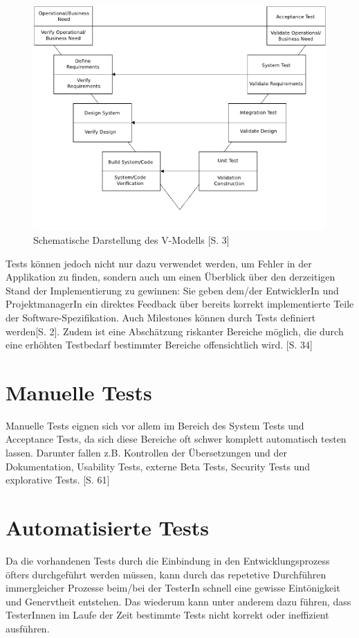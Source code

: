 \documentclass[a4paper,bibtotoc,oneside]{scrbook}
\begin{document}
\begin{figure}[h!]
\centering
\includegraphics[width=120mm]{img/vmodel.png}
\caption[Schematische Darstellung des V-Modells]{Schematische Darstellung des V-Modells \cite{vmodel}[S. 3]}\label{Abb3}
\end{figure}

Tests können jedoch nicht nur dazu verwendet werden, um Fehler in der Applikation zu finden, sondern auch um einen Überblick über den derzeitigen Stand der Implementierung zu gewinnen: Sie geben dem/der EntwicklerIn und ProjektmanagerIn ein direktes Feedback über bereits korrekt implementierte Teile der Software-Spezifikation. Auch Milestones können durch Tests definiert werden\cite{test_auto}[S. 2]. Zudem ist eine Abschätzung riskanter Bereiche möglich, die durch eine erhöhten Testbedarf bestimmter Bereiche offensichtlich wird. \cite{testing_apps_on_web}[S. 34]


\section{Manuelle Tests}
Manuelle Tests eignen sich vor allem im Bereich des System Tests und Acceptance Tests, da sich diese Bereiche oft schwer komplett automatisch testen lassen. Darunter fallen z.B. Kontrollen der Übersetzungen und der Dokumentation, Usability Tests, externe Beta Tests, Security Tests und explorative Tests. \cite{test_large_systems}[S. 61]


\section{Automatisierte Tests}
Da die vorhandenen Tests durch die Einbindung in den Entwicklungsprozess öfters durchgeführt werden müssen, kann durch das repetetive Durchführen immergleicher Prozesse beim/bei der TesterIn schnell eine gewisse Eintönigkeit und Genervtheit entstehen. Das wiederum kann unter anderem dazu führen, dass TesterInnen im Laufe der Zeit bestimmte Tests nicht korrekt oder ineffizient ausführen. 
\end{document}
